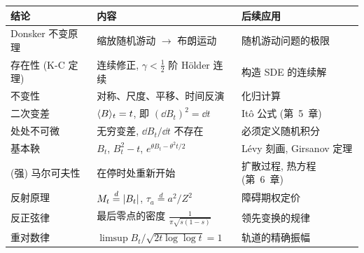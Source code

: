 \begin{center}
\begin{minipage}{\textwidth}
\centering
{}
\label{tab:ch4-summary}
\renewcommand{\arraystretch}{1.5}
\begin{tabular}{>{\raggedright\arraybackslash}p{} >{\raggedright\arraybackslash}p{} >{\raggedright\arraybackslash}p{}}
\toprule
结论 & 内容 & 后续应用 \\
\midrule
Donsker 不变原理 & 缩放随机游动 $\to$ 布朗运动 & 随机游动问题的极限 \\
存在性 (K-C 定理) & 连续修正, $\gamma<\frac12$ 阶 H\"older 连续 & 构造 SDE 的连续解 \\
不变性 & 对称、尺度、平移、时间反演 & 化归计算 \\
二次变差 & $\langle B\rangle_t=t$, 即 $(\dd B_t)^2=\dd t$ & It\^o 公式 (第~5~章) \\
处处不可微 & 无穷变差, $\dd B_t/\dd t$ 不存在 & 必须定义随机积分 \\
基本鞅 & $B_t$, $B_t^2-t$, $e^{\theta B_t-\theta^2t/2}$ & L\'evy 刻画, Girsanov 定理 \\
(强) 马尔可夫性 & 在停时处重新开始 & 扩散过程, 热方程 (第~6~章) \\
反射原理 & $M_t\overset{d}{=}\lvert B_t\rvert$, $\tau_a\overset{d}{=}a^2/Z^2$ & 障碍期权定价 \\
反正弦律 & 最后零点的密度 $\frac{1}{\pi\sqrt{s(1-s)}}$ & 领先变换的规律 \\
重对数律 & $\limsup B_t/\sqrt{2t\log\log t}=1$ & 轨道的精确振幅 \\
\bottomrule
\end{tabular}
\end{minipage}
\end{center}
